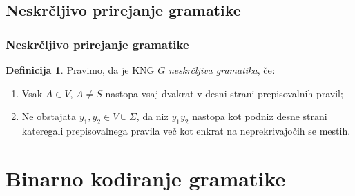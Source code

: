 \documentclass{beamer}
\theoremstyle{definition}
\newtheorem{definicija}{Definicija}[section]
\begin{document}
\subsection{Neskrčljivo prirejanje gramatike}

\begin{frame}
    \frametitle{Neskrčljivo prirejanje gramatike}
    \begin{definicija}
        Pravimo, da je KNG $G$ \emph{neskrčljiva gramatika}, če:
        \begin{enumerate}
            \item Vsak $A \in V$, $A \neq S$ nastopa vsaj dvakrat v desni strani prepisovalnih pravil;
            \item Ne obstajata $y_1,y_2 \in V \cup \Sigma$, da niz $y_1y_2$ nastopa kot podniz desne 
            strani kateregali prepisovalnega pravila več kot enkrat na neprekrivajočih se mestih. 
        \end{enumerate}
    \end{definicija}
\end{frame}

\section{Binarno kodiranje gramatike}
\end{document}
